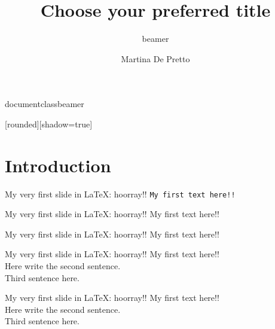 documentclass{beamer}
\usepackage{listings}
% 
[rounded][shadow=true]
% 

\title{Choose your preferred title}
 \subtitle{beamer}
 \author{Martina De Pretto}


\maketitle


\section{Introduction}

\begin{frame}{My very first slide in LaTeX: hoorray!!}
    \texttt{My first text here!!}
\end{frame}

\begin{frame}{My very first slide in LaTeX: hoorray!!}
    \scriptsize{My first text here!!}
\end{frame}

\begin{frame}{My very first slide in LaTeX: hoorray!!}
    \tiny{My first text here!!}
\end{frame}



\begin{frame}{My very first slide in LaTeX: hoorray!!}
    My first text here!! \\
    Here write the second sentence. \\
    Third sentence here.
\end{frame}


\begin{frame}{My very first slide in LaTeX: hoorray!!}
    My first text here!! \\
    \bigskip
    Here write the second sentence. \\
    \bigskip
    Third sentence here.
\end{frame}

